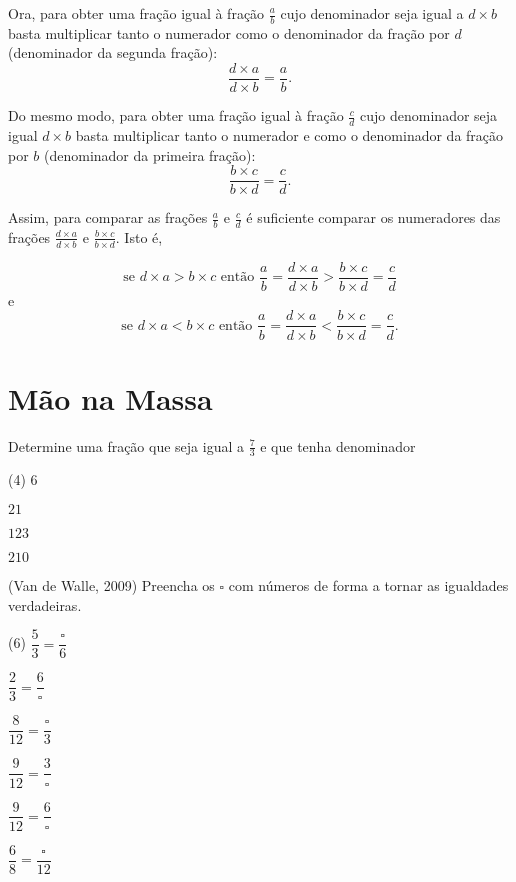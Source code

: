 Ora, para obter uma fração igual à fração $\frac{a}{b}$ cujo denominador seja igual a $d\times b$ basta multiplicar tanto o numerador como o denominador da fração por $d$ (denominador da segunda fração):
$$\dfrac{d\times a}{d \times b} =  \dfrac{a}{b}.$$

Do mesmo modo, para obter uma fração igual à fração $\frac{c}{d}$ cujo denominador seja igual $d\times b$ basta multiplicar tanto o numerador e como o denominador da fração por $b$ (denominador da primeira fração):
$$\dfrac{b\times c}{b \times d} =  \dfrac{c}{d}.$$

Assim, para comparar as frações $\frac{a}{b}$ e $\frac{c}{d}$ é suficiente comparar os numeradores das frações  $\frac{d\times a}{d \times b}$ e $\frac{b\times c}{b \times d}$.
Isto é,

$$\text{se } d\times a > b\times c \text{ então }  \dfrac{a}{b} = \dfrac{d\times a}{d \times b} >\dfrac{b\times c}{b \times d} =  \dfrac{c}{d}$$
e
$$\text{se } d\times a < b\times c \text{ então }  \dfrac{a}{b} = \dfrac{d\times a}{d \times b} < \dfrac{b\times c}{b \times d} =  \dfrac{c}{d}.$$


\section{Mão na Massa}

\begin{atividade}{}\label{chap4-ativ9}

Determine uma fração que seja igual a $\frac{7}{3}$ e que tenha denominador


\begin{tasks}(4)
\task $6$

\task $21$

\task $123$

\task $210$
\end{tasks}
\end{atividade}

\begin{atividade}{}\label{chap4-ativ10}

(Van de Walle, 2009)
Preencha os $\square$ com números de forma a tornar as igualdades verdadeiras.

\begin{tasks}(6)
\task $\dfrac{5}{3} = \dfrac{\square}{6}$

\task $\dfrac{2}{3} = \dfrac{6}{\square}$ 

\task $\dfrac{8}{12} = \dfrac{\square}{3}$ 

\task $\dfrac{9}{12} = \dfrac{3}{\square}$ 

\task $\dfrac{9}{12} = \dfrac{6}{\square}$ 

\task  $\dfrac{6}{8} = \dfrac{\square}{12}$
\end{tasks}
\end{atividade}

